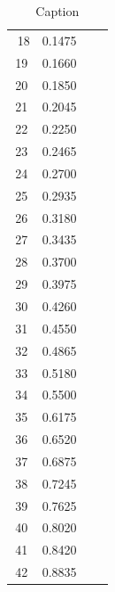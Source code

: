 \documentclass[12pt, a4paper]{article}
\begin{document}
\begin{table}[h!]
{\begin{tabular}{|c|c|c|c|}
$$         \footnotesize 18 & \footnotesize0.1475& & \\
         \footnotesize 19 & \footnotesize0.1660& & \\
         \footnotesize 20 & \footnotesize0.1850& & \\
         \footnotesize 21 & \footnotesize0.2045& & \\
         \footnotesize 22 &\footnotesize 0.2250& & \\
         \footnotesize 23 & \footnotesize0.2465& & \\
         \footnotesize 24 & \footnotesize0.2700& & \\
         \footnotesize 25 & \footnotesize0.2935& & \\
         \footnotesize 26 & \footnotesize0.3180& & \\
         \footnotesize 27 & \footnotesize0.3435& & \\
         \footnotesize 28 & \footnotesize0.3700& & \\
         \footnotesize 29 & \footnotesize0.3975& & \\
         \footnotesize 30 & \footnotesize0.4260& & \\
         \footnotesize 31 & \footnotesize0.4550& & \\ 
         \footnotesize 32 & \footnotesize0.4865& & \\
         \footnotesize 33 & \footnotesize0.5180& & \\
         \footnotesize 34 & \footnotesize0.5500& & \\
         \footnotesize 35 & \footnotesize0.6175& & \\
         \footnotesize 36 & \footnotesize0.6520& & \\
         \footnotesize 37 & \footnotesize0.6875& & \\
         \footnotesize 38 & \footnotesize0.7245& & \\
         \footnotesize 39 & \footnotesize0.7625& & \\
         \footnotesize 40 & \footnotesize0.8020& & \\
         \footnotesize 41 & \footnotesize0.8420& & \\
         \footnotesize 42 &\footnotesize 0.8835& & \\
    \hline
         
    \end{tabular}}
    \caption{Caption}
    \label{Tabella Completa}
\end{table}
\end{document}
